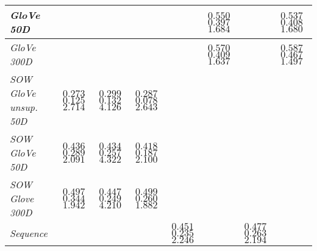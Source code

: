 \documentclass[a4paper,11pt]{article}
\begin{document}
\begin{table}[ht]
\begin{center}
\begin{tabular}{|m{2cm}||m{1.4cm}m{1.4cm}m{1.4cm}m{1.4cm}m{1.4cm}m{1.4cm}m{1.4cm}|}
 \hline
\textit{GloVe 50D} & & & & & $0.550$ \newline $0.397$ \newline $1.684$ & & $0.537$ \newline $0.408$ \newline $1.680$ \\
 \hline
\textit{GloVe 300D} & & & & & $0.570$ \newline $0.409$ \newline $1.637$ & & $0.587$ \newline $0.467$ \newline $1.497$ \\
 \hline
\textit{SOW GloVe unsup. 50D} & $0.273$ \newline $0.125$ \newline $2.714$ & $0.299$ \newline $0.132$ \newline $4.126$ & $0.287$ \newline $0.078$ \newline $2.643$ & & & & \\
 \hline
\textit{SOW GloVe 50D} & $0.436$ \newline $0.289$ \newline $2.091$ & $0.434$ \newline $0.257$ \newline $4.322$ & $0.418$ \newline $0.187$ \newline $2.100$ & & & & \\
 \hline
\textit{SOW Glove 300D}  & $0.497$ \newline $0.344$ \newline $1.942$ & $0.447$ \newline $0.249$ \newline $4.210$ & $0.499$ \newline $0.260$ \newline $1.882$ & & & & \\
 \hline
\textit{Sequence} & & & & $0.451$ \newline $0.235$ \newline $2.246$ & & $0.477$ \newline $0.263$ \newline $2.194$ & \\
   \hline
\end{tabular}

  \caption{}  
  \label{tab:preselection}
\end{center}
\end{table}
\end{document}
